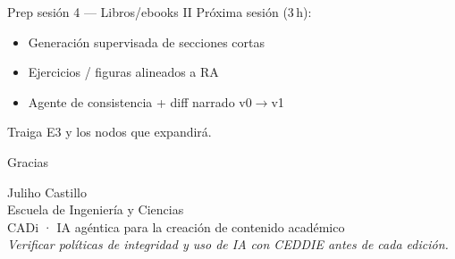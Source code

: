 \documentclass[aspectratio=169,11pt]{beamer}
\begin{document}
\begin{frame}{Prep sesión 4 --- Libros/ebooks II}
Próxima sesión (3\,h):
\begin{itemize}
\item Generación supervisada de secciones cortas
\item Ejercicios / figuras alineados a RA
\item Agente de consistencia + diff narrado v0$\rightarrow$v1
\end{itemize}
Traiga E3 y los nodos que expandirá.
\end{frame}

\begin{frame}{Gracias}
\begin{center}
{\Large Juliho Castillo}\\[0.5em]
Escuela de Ingeniería y Ciencias\\[1em]
CADi · IA agéntica para la creación de contenido académico\\[1.5em]
{\small \emph{Verificar políticas de integridad y uso de IA con CEDDIE antes de cada edición.}}
\end{center}
\end{frame}
\end{document}
